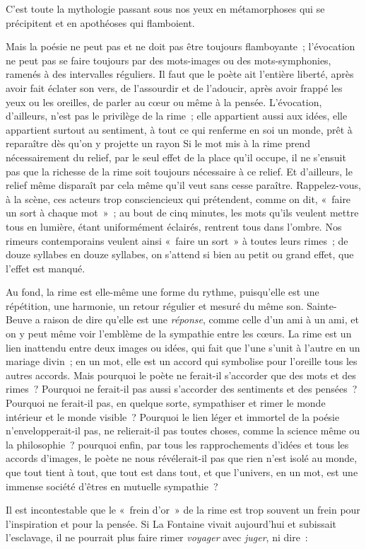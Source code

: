 \documentclass[french,twoside]{book} %
\begin{document}
\noindent C’est toute la mythologie passant sous nos yeux en métamorphoses qui se précipitent et en apothéoses qui flamboient.\par
Mais la poésie ne peut pas et ne doit pas être toujours flamboyante ; l’évocation ne peut pas se faire toujours par des mots-images ou des mots-symphonies, ramenés à des intervalles réguliers. Il faut que le poète ait l’entière liberté, après avoir fait éclater son vers, de l’assourdir et de l’adoucir, après avoir frappé les yeux ou les oreilles, de parler au cœur ou même à la pensée. L’évocation, d’ailleurs, n’est pas le privilège de la rime ; elle appartient aussi aux idées, elle appartient surtout au sentiment, à tout ce qui renferme en soi un monde, prêt à reparaître dès qu’on y projette un rayon Si le mot mis à la rime prend nécessairement du relief, par le seul effet de la place qu’il occupe, il ne s’ensuit pas que la richesse de la rime soit toujours nécessaire à ce relief. Et d’ailleurs, le relief même disparaît par cela même qu’il veut sans cesse paraître. Rappelez-vous, à la scène, ces acteurs trop consciencieux qui prétendent, comme on dit, « faire un sort à chaque mot » ; au bout de cinq minutes, les mots qu’ils veulent mettre tous en lumière, étant uniformément éclairés, rentrent tous dans l’ombre. Nos rimeurs contemporains veulent ainsi « faire un sort » à toutes leurs rimes ; de douze syllabes en douze syllabes, on s’attend si bien au petit ou grand effet, que l’effet est manqué.\par
Au fond, la rime est elle-même une forme du rythme, puisqu’elle est une répétition, une harmonie, un retour régulier et mesuré du même son. Sainte-Beuve a raison de dire qu’elle est une \emph{réponse}, comme celle d’un ami à un ami, et on y peut même voir l’emblème de la sympathie entre les cœurs. La rime est un lien inattendu entre deux images ou idées, qui fait que l’une s’unit à l’autre en un mariage divin ; en un mot, elle est un accord qui symbolise pour l’oreille tous les autres accords. Mais pourquoi le poète ne ferait-il s’accorder que des mots et des rimes ? Pourquoi ne ferait-il pas aussi s’accorder des sentiments et des pensées ? Pourquoi ne ferait-il pas, en quelque sorte, sympathiser et rimer le monde intérieur et le monde visible ? Pourquoi le lien léger et immortel de la poésie n’envelopperait-il pas, ne relierait-il pas toutes choses, comme la science même ou la philosophie ? pourquoi enfin, par tous les rapprochements d’idées et tous les accords d’images, le poète ne nous révélerait-il pas que rien n’est isolé au monde, que tout tient à tout, que tout est dans tout, et que l’univers, en un mot, est une immense société d’êtres en mutuelle sympathie ?\par
Il est incontestable que le « frein d’or » de la rime est trop souvent un frein pour l’inspiration et pour la pensée. Si La Fontaine vivait aujourd’hui et subissait l’esclavage, il ne pourrait plus faire rimer \emph{voyager} avec \emph{juger}, ni dire :\par
\end{document}
